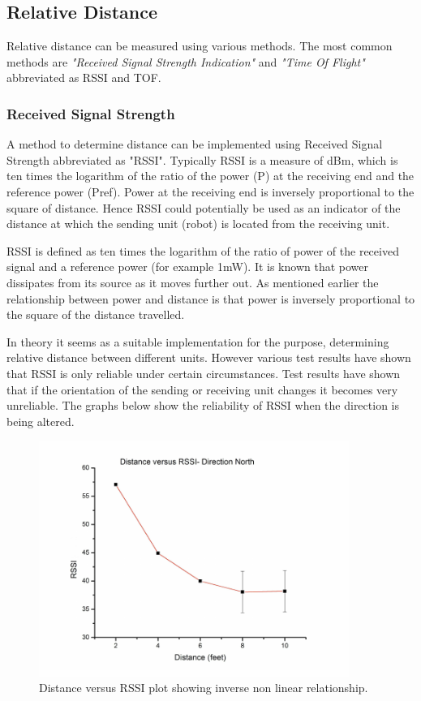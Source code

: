 \documentclass[10pt,a4paper]{article}
\begin{document}
\subsection{Relative Distance}
Relative distance can be measured using various methods. The most common methods are \textit{"Received Signal Strength Indication"} and \textit{"Time Of Flight"} abbreviated as RSSI and TOF. 

\subsubsection{Received Signal Strength}
A method to determine distance can be implemented using Received Signal Strength abbreviated as "RSSI". Typically RSSI is a measure of dBm, which is ten times the logarithm of the ratio of the power (P) at the receiving end and the reference power (Pref). Power at the receiving end is inversely proportional to the square of distance.\cite{RSSI} Hence RSSI could potentially be used as an indicator of the distance at which the sending unit (robot) is located from the receiving unit.\cite{RSSI}

RSSI is defined as ten times the logarithm of the ratio of power of the received signal and a reference power (for example 1mW). It is known that power dissipates from its source as it moves further out. As mentioned earlier the relationship between power and distance is that power is inversely proportional to the square of the distance travelled. \cite{RSSI}

In theory it seems as a suitable implementation for the purpose, determining relative distance between different units. However various test results have shown that RSSI is only reliable under certain circumstances. Test results have shown that if the orientation of the sending or receiving unit changes it becomes very unreliable. The graphs below show the reliability of RSSI when the direction is being altered.\cite{RSSI}

\begin{figure}[H]
\centering
\includegraphics[width=0.9\textwidth]{North.pdf}
\caption{Distance versus RSSI plot showing inverse non linear
relationship.\cite{RSSI}}
\label{North}
\end{figure}
\end{document}
